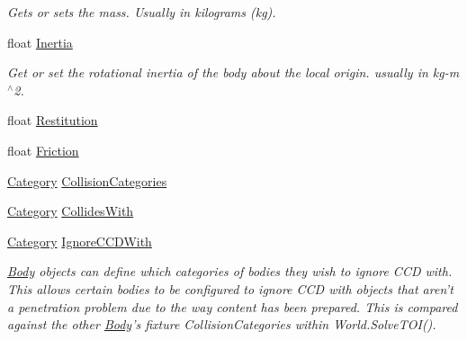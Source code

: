 \begin{DoxyCompactItemize}
\begin{DoxyCompactList}\small\item\em Gets or sets the mass. Usually in kilograms (kg). \end{DoxyCompactList}\item 
float \hyperlink{class_farseer_physics_1_1_dynamics_1_1_body_ae3d5f6e2aadcce6f3ee52f46e7a36a87}{Inertia}
\begin{DoxyCompactList}\small\item\em Get or set the rotational inertia of the body about the local origin. usually in kg-\/m$^\wedge$2. \end{DoxyCompactList}\item 
float \hyperlink{class_farseer_physics_1_1_dynamics_1_1_body_a756747715ac4eaa40ab91f2912faa773}{Restitution}
\item 
float \hyperlink{class_farseer_physics_1_1_dynamics_1_1_body_aaafb425a33fb4a2825570896d0f8a58e}{Friction}
\item 
\hyperlink{namespace_farseer_physics_1_1_dynamics_a411fb391cb862402e877a2d3d4e11bef}{Category} \hyperlink{class_farseer_physics_1_1_dynamics_1_1_body_aa22daeba6218254a3234af0262fccc7b}{Collision\+Categories}
\item 
\hyperlink{namespace_farseer_physics_1_1_dynamics_a411fb391cb862402e877a2d3d4e11bef}{Category} \hyperlink{class_farseer_physics_1_1_dynamics_1_1_body_a5d044aee1c3411b4ed6375ca0c90fbfb}{Collides\+With}
\item 
\hyperlink{namespace_farseer_physics_1_1_dynamics_a411fb391cb862402e877a2d3d4e11bef}{Category} \hyperlink{class_farseer_physics_1_1_dynamics_1_1_body_aee9c3d9420664f0197aaeb4c49454098}{Ignore\+C\+C\+D\+With}
\begin{DoxyCompactList}\small\item\em \hyperlink{class_farseer_physics_1_1_dynamics_1_1_body}{Body} objects can define which categories of bodies they wish to ignore C\+C\+D with. This allows certain bodies to be configured to ignore C\+C\+D with objects that aren't a penetration problem due to the way content has been prepared. This is compared against the other \hyperlink{class_farseer_physics_1_1_dynamics_1_1_body}{Body}'s fixture Collision\+Categories within World.\+Solve\+T\+O\+I(). \end{DoxyCompactList}\item 

\end{DoxyCompactItemize}
